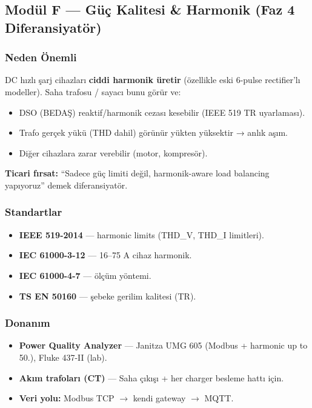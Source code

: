 \documentclass[11pt,a4paper]{article}
\begin{document}
\subsection{Modül F — Güç Kalitesi \& Harmonik (Faz 4 Diferansiyatör)}

\subsubsection{Neden Önemli}

DC hızlı şarj cihazları \textbf{ciddi harmonik üretir} (özellikle eski 6-pulse rectifier'lı modeller). Saha trafosu / sayacı bunu görür ve:
\begin{itemize}
    \item DSO (BEDAŞ) reaktif/harmonik cezası kesebilir (IEEE 519 TR uyarlaması).
    \item Trafo gerçek yükü (THD dahil) görünür yükten yüksektir → anlık aşım.
    \item Diğer cihazlara zarar verebilir (motor, kompresör).
\end{itemize}

\textbf{Ticari fırsat:} ``Sadece güç limiti değil, harmonik-aware load balancing yapıyoruz'' demek diferansiyatör.

\subsubsection{Standartlar}

\begin{itemize}
    \item \textbf{IEEE 519-2014} --- harmonic limits (THD\_V, THD\_I limitleri).
    \item \textbf{IEC 61000-3-12} --- 16--75 A cihaz harmonik.
    \item \textbf{IEC 61000-4-7} --- ölçüm yöntemi.
    \item \textbf{TS EN 50160} --- şebeke gerilim kalitesi (TR).
\end{itemize}

\subsubsection{Donanım}

\begin{itemize}
    \item \textbf{Power Quality Analyzer} --- Janitza UMG 605 (Modbus + harmonic up to 50.), Fluke 437-II (lab).
    \item \textbf{Akım trafoları (CT)} --- Saha çıkışı + her charger besleme hattı için.
    \item \textbf{Veri yolu:} Modbus TCP $\rightarrow$ kendi gateway $\rightarrow$ MQTT.
\end{itemize}
\end{document}
